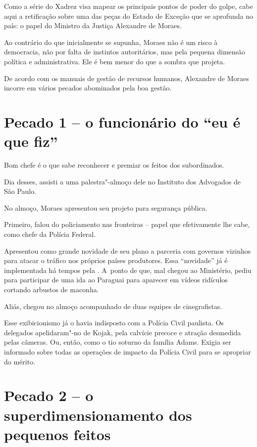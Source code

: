  

Como a série do Xadrez visa mapear os principais pontos de poder do
golpe, cabe aqui a retificação sobre uma das peças do Estado de Exceção
que se aprofunda no país: o papel do Ministro da Justiça Alexandre de
Moraes.

Ao contrário do que inicialmente se supunha, Moraes não é um risco à
democracia, não por falta de instintos autoritários, mas pela pequena
dimensão política e administrativa. Ele é bem menor do que a sombra que
projeta.

De acordo com os manuais de gestão de recursos humanos, Alexandre de
Moraes incorre em vários pecados abominados pela boa gestão.

\section{Pecado 1 -- o funcionário do ``eu é que fiz''}

Bom chefe é o que sabe reconhecer e premiar os feitos dos subordinados.

Dia desses, assisti a uma palestra"-almoço dele no Instituto dos
Advogados de São Paulo.

No almoço, Moraes apresentou seu projeto para segurança pública.

Primeiro, falou do policiamento nas fronteiras -- papel que efetivamente
lhe cabe, como chefe da Polícia Federal.

Apresentou como grande novidade de seu plano a parceria com governos
vizinhos para atacar o tráfico nos próprios países produtores. Essa
``novidade'' já é implementada há tempos pela . A~ponto de que, mal
chegou ao Ministério, pediu para participar de uma ida ao Paraguai para
aparecer em vídeos ridículos cortando arbustos de maconha.

Aliás, chegou no almoço acompanhado de duas equipes de cinegrafistas.

Esse exibicionismo já o havia indisposto com a Polícia Civil paulista.
Os delegados apelidaram"-no de Kojak, pela calvície precoce e atração
desmedida pelas câmeras. Ou, então, como o tio soturno da família Adams.
Exigia ser informado sobre todas as operações de impacto da Polícia
Civil para se apropriar do mérito.

\section{Pecado 2 -- o superdimensionamento dos pequenos feitos}

